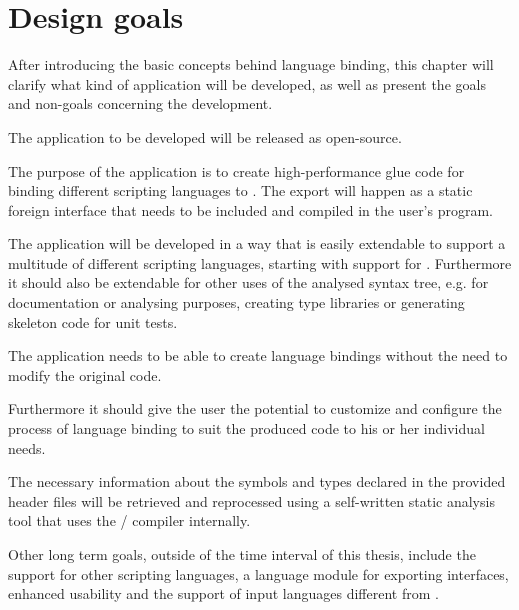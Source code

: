 \chapter{Design goals}
\label{chap:DesignGoals}

After introducing the basic concepts behind language binding, this chapter will clarify what kind of application will be developed, as well as present the goals and non-goals concerning the development.

The application to be developed will be released as open-source.

The purpose of the application is to create high-performance glue code for binding different scripting languages to . The export will happen as a static foreign interface that needs to be included and compiled in the user's program.

The application will be developed in a way that is easily extendable to support a multitude of different scripting languages, starting with support for . Furthermore it should also be extendable for other uses of the analysed  syntax tree, e.g. for documentation or analysing purposes, creating type libraries or generating skeleton code for unit tests.

The application needs to be able to create language bindings without the need to modify the original code.

Furthermore it should give the user the potential to customize and configure the process of language binding to suit the produced code to his or her individual needs.

The necessary information about the symbols and types declared in the provided  header files will be retrieved and reprocessed using a self-written static analysis tool that uses the  / compiler internally.

Other long term goals, outside of the time interval of this thesis, include the support for other scripting languages, a language module for exporting  interfaces, enhanced usability and the support of input languages different from .